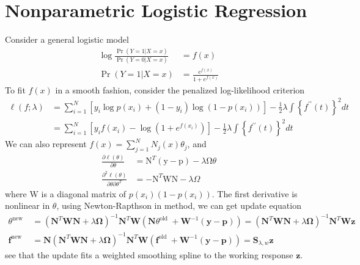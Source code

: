 \section{Nonparametric Logistic Regression}
Consider a general logistic model
\begin{align*}
    \log \frac{\operatorname{Pr}(Y=1 | X=x)}{\operatorname{Pr}(Y=0 | X=x)}&=f(x)\\
    \operatorname{Pr}(Y=1 | X=x)&=\frac{e^{f(x)}}{1+e^{f(x)}}
\end{align*}
To fit $f(x)$ in a smooth fashion, consider the penalized log-likelihood criterion
\begin{align*}
\ell(f ; \lambda) 
&=\sum_{i=1}^{N}\left[y_{i}\log p\left(x_{i}\right)+\left(1-y_{i}\right)\log\left(1-p\left(x_{i}\right)\right)\right]-\frac{1}{2} \lambda \int\left\{f^{\prime \prime}(t)\right\}^{2}dt\\
&=\sum_{i=1}^{N}\left[y_{i} f\left(x_{i}\right)-\log \left(1+e^{f\left(x_{i}\right)}\right)\right]-\frac{1}{2} \lambda \int\left\{f^{\prime \prime}(t)\right\}^{2} dt
\end{align*}
We can also represent $f(x)=\sum_{j=1}^{N} N_{j}(x) \theta_{j}$, and
\begin{align*} 
\frac{\partial \ell(\theta)}{\partial \theta} 
&=\mathrm{N}^{T}(\mathrm{y}-\mathrm{p})-\lambda \mathrm{\Omega} \theta \\ 
\frac{\partial^{2} \ell(\theta)}{\partial \theta \partial \theta^{T}} 
&=-\mathrm{N}^{T} \mathrm{WN}-\lambda \Omega 
\end{align*}
where $\mathrm{W}$ is a diagonal matrix of $p(x_i)(1-p(x_i))$. 
The first derivative is nonlinear in $\theta$, using Newton-Rapthson in method, we can get
update equation
\begin{align*} 
\theta^{\text {new }}
&=\left(\mathbf{N}^{T}\mathbf{W N}+\lambda\mathbf{\Omega}\right)^{-1}\mathbf{N}^{T}
\mathbf{W}\left(\mathbf{N} \theta^{\text {old }}+\mathbf{W}^{-1}(\mathbf{y}-\mathbf{p})\right)
=\left(\mathbf{N}^{T}\mathbf{W}\mathbf{N}+\lambda\mathbf{\Omega}\right)^{-1}\mathbf{N}^{T}\mathbf{W}\mathbf{z} \\
\mathbf{f}^{\text {new }}&=\mathbf{N}\left(\mathbf{N}^{T} \mathbf{W} \mathbf{N}+\lambda \mathbf{\Omega}\right)^{-1} \mathbf{N}^{T} \mathbf{W}\left(\mathbf{f}^{\text {old }}+\mathbf{W}^{-1}(\mathbf{y}-\mathbf{p})\right)
=\mathbf{S}_{\lambda, w}\mathbf{z}
\end{align*}
see that the update fits a weighted smoothing spline to the working response $\mathbf{z}$. 

